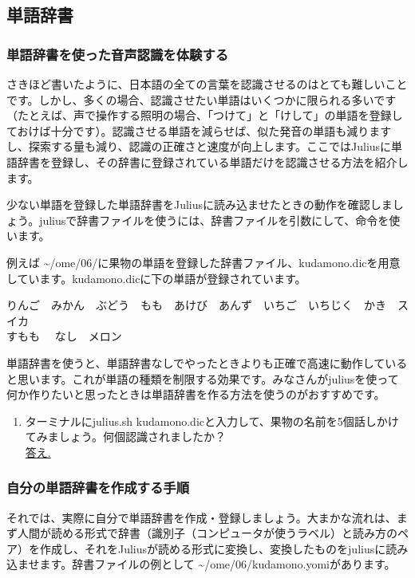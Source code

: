 \subsection{単語辞書}
\subsubsection{単語辞書を使った音声認識を体験する}
さきほど書いたように、日本語の全ての言葉を認識させるのはとても難しいことです。しかし、多くの場合、認識させたい単語はいくつかに限られる多いです（たとえば、声で操作する照明の場合、「つけて」と「けして」の単語を登録しておけば十分です）。認識させる単語を減らせば、似た発音の単語も減りますし、探索する量も減り、認識の正確さと速度が向上します。ここではJuliusに単語辞書を登録し、その辞書に登録されている単語だけを認識させる方法を紹介します。

少ない単語を登録した単語辞書をJuliusに読み込ませたときの動作を確認しましょう。juliusで辞書ファイルを使うには、辞書ファイルを引数にして、命令を使います。\\

例えば \textasciitilde /ome/06/に果物の単語を登録した辞書ファイル、kudamono.dicを用意しています。kudamono.dicに下の単語が登録されています。
\begin{center}
	りんご　みかん　ぶどう　もも　あけび　あんず　いちご　いちじく　かき　スイカ\\すもも　	なし　メロン
\end{center}

単語辞書を使うと、単語辞書なしでやったときよりも正確で高速に動作していると思います。これが単語の種類を制限する効果です。みなさんがjuliusを使って何か作りたいと思ったときは単語辞書を作る方法を使うのがおすすめです。\\

\begin{tcolorbox}[title=\useOmetoi]
\begin{enumerate}
\item ターミナルにjulius.sh kudamono.dicと入力して、果物の名前を5個話しかけてみましょう。何個認識されましたか？\\ \underline{答え.\hspace{0.8\linewidth}}
\end{enumerate}
\end{tcolorbox}

\subsubsection{自分の単語辞書を作成する手順}
それでは、実際に自分で単語辞書を作成・登録しましょう。大まかな流れは、まず人間が読める形式で辞書（識別子（コンピュータが使うラベル）と読み方のペア）を作成し、それをJuliusが読める形式に変換し、変換したものをjuliusに読み込ませます。辞書ファイルの例として \textasciitilde /ome/06/kudamono.yomiがあります。\\

